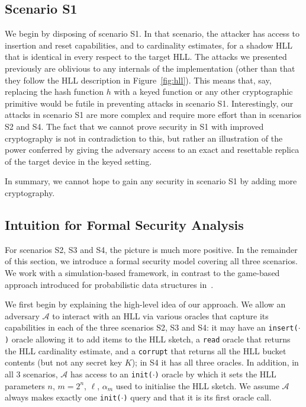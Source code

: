 \documentclass[sigconf, anonymous, dvipsnames]{acmart} %
\begin{document}
\subsection{Scenario S1}
We begin by disposing of scenario S1. In that scenario, the attacker has access to insertion and reset capabilities, and to cardinality estimates, for a shadow HLL that is identical in every respect to the target HLL. The attacks we presented previously are oblivious to any internals of the implementation (other than that they follow the HLL description in Figure~\ref{fig:hll}). This means that, say, replacing the hash function $h$ with a keyed function or any other cryptographic primitive would be futile in preventing attacks in scenario S1. Interestingly, our attacks in scenario S1 are more complex and require more effort than in scenarios S2 and S4. The fact that we cannot prove security in S1 with improved cryptography is not in contradiction to this, but rather an illustration of the power conferred by giving the adversary access to an exact and resettable replica of the target device in the keyed setting.

In summary, we cannot hope to gain any security in scenario S1 by adding more cryptography.

\subsection{Intuition for Formal Security Analysis}

For scenarios S2, S3 and S4, the picture is much more positive. In the remainder of this section, we introduce a formal security model covering all three scenarios. We work with a simulation-based framework, in contrast to the game-based approach introduced for probabilistic data structures in~\cite{CCS:ClaPatShrPS19}. %

We first begin by explaining the high-level idea of our approach. We allow an adversary ${\mathcal{A}}$ to interact with an HLL via various oracles that capture its capabilities in each of the three scenarios S2, S3 and S4: it may have an \texttt{insert($\cdot$)} oracle allowing it to add items to the HLL sketch, a \texttt{read} oracle that returns the HLL cardinality estimate, and a \texttt{corrupt} that returns all the HLL bucket contents (but not any secret key $K$); in S4 it has all three oracles. In addition, in all 3 scenarios, ${\mathcal{A}}$ has access to an \texttt{init($\cdot$)} oracle by which it sets the HLL parameters $n$, $m=2^n$, $\ell$, $\alpha_m$ used to initialise the HLL sketch. We assume ${\mathcal{A}}$ always makes exactly one \texttt{init($\cdot$)} query and that it is its first oracle call.
\end{document}
